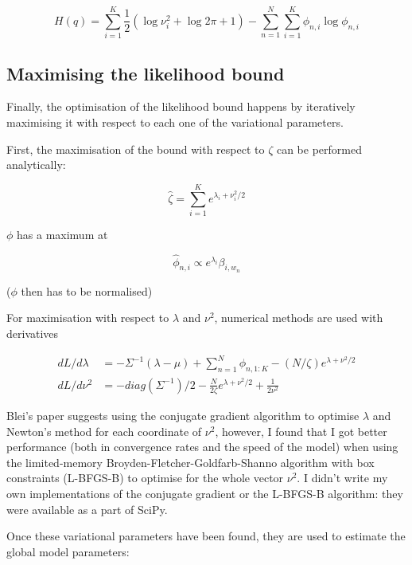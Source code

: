 \documentclass[12pt,a4paper,twoside,openright]{report}
\begin{document}
\begin{equation}
\mathit{H}(q) = \sum\limits_{i=1}^K\frac{1}{2}(\log\nu_i^2 + \log 2 \pi + 1) - \sum\limits_{n=1}^N\sum\limits_{i=1}^K\phi_{n,i}\log\phi_{n,i}
\end{equation}

\subsection{Maximising the likelihood bound}

Finally, the optimisation of the likelihood bound happens by iteratively maximising it with respect to each one of the variational parameters.

First, the maximisation of the bound with respect to $\zeta$ can be performed analytically:

\begin{equation}
\hat\zeta = \sum\limits_{i=1}^Ke^{\lambda_i + \nu_i^2 / 2}
\end{equation}

$\phi$ has a maximum at

\begin{equation}
\hat\phi_{n, i} \propto e^{\lambda_i}\beta_{i, w_n} \label{eq:phiopt}
\end{equation}

($\phi$ then has to be normalised)

For maximisation with respect to $\lambda$ and $\nu^2$, numerical methods are used with derivatives

\begin{align}
dL/d\lambda & = -\Sigma^{-1}(\lambda - \mu) + \sum\limits_{n=1}^N\phi_{n, 1:K} - (N/\zeta)e^{\lambda + \nu^2/2} \\
dL/d\nu^2 & = -\mathit{diag}(\Sigma^{-1})/2 - \frac{N}{2\zeta}e^{\lambda + \nu^2/2} + \frac{1}{2\nu^2}
\end{align}

Blei's paper suggests using the conjugate gradient algorithm to optimise $\lambda$ and Newton's method for each coordinate of $\nu^2$, however, I found that I got better performance (both in convergence rates and the speed of the model) when using the limited-memory Broyden-Fletcher-Goldfarb-Shanno algorithm with box constraints (L-BFGS-B) to optimise for the whole vector $\nu^2$. I didn't write my own implementations of the conjugate gradient or the L-BFGS-B algorithm: they were available as a part of SciPy.

Once these variational parameters have been found, they are used to estimate the global model parameters:
\end{document}
